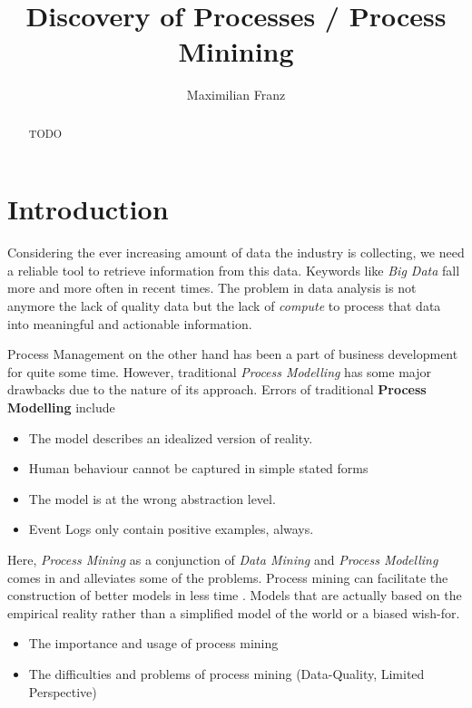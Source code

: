 \documentclass[a4paper]{IEEEtran}
\title{Discovery of Processes / Process Minining}
\author{Maximilian Franz}
\begin{document}
\maketitle

\begin{abstract}
TODO
\end{abstract}

\section{Introduction}
Considering the ever increasing amount of data \cite{manyika2011bigdata} \cite{hilbert2011worldcapacity}
the industry is collecting, we need a reliable tool to retrieve information from this data. Keywords like \textit{Big Data} fall more and more often in recent times. The problem in data analysis is not anymore the lack of quality data but the lack of \textit{compute} to process that data into meaningful and actionable information. 

Process Management on the other hand has been a part of business development for quite some time. However, traditional \textit{Process Modelling} has some major drawbacks due to the nature of its approach. 
Errors of traditional \textbf{Process Modelling} include
\begin{itemize}
    \item The model describes an idealized version of reality.
    \item Human behaviour cannot be captured in simple stated forms
    \item The model is at the wrong abstraction level. 
    \item Event Logs only contain positive examples, always.
\end{itemize}
Here, \textit{Process Mining} as a conjunction of \textit{Data Mining} and \textit{Process Modelling} comes in and alleviates some of the problems. 
Process mining can facilitate the construction of better models in less time \cite{process_mining}. Models that are actually based on the empirical reality rather than a simplified model of the world or a biased wish-for. 


\begin{itemize}
    \item The importance and usage of process mining 
    \item The difficulties and problems of process mining (Data-Quality, Limited Perspective)
\end{itemize}
\end{document}
